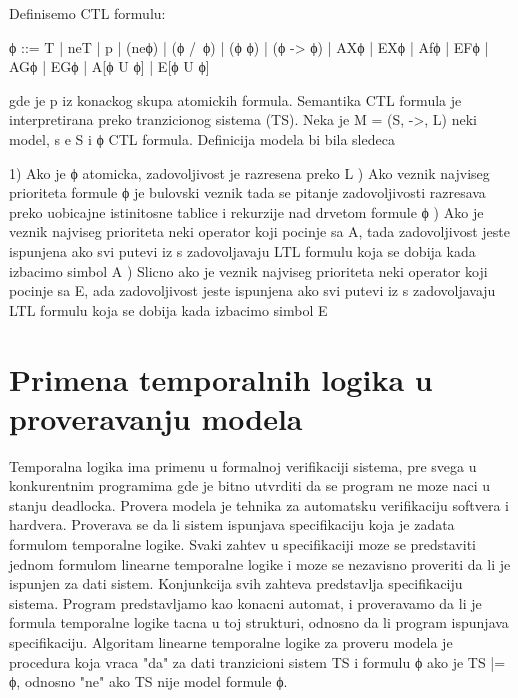 \documentclass[a4paper]{article}
\begin{document}
	Definisemo CTL formulu:

	ϕ ::= T | neT | p | (neϕ) | (ϕ /\ ϕ) | (ϕ \/ ϕ) | (ϕ -> ϕ) | AXϕ | EXϕ | Afϕ | EFϕ | AGϕ | EGϕ | A[ϕ U ϕ] | E[ϕ U ϕ]

	gde je p iz konackog skupa atomickih formula.
	\newline
	\newline
	Semantika
	\newline
	\newline
	CTL formula je interpretirana preko tranzicionog sistema (TS). Neka je M = (S, ->, L) neki model, s e S i ϕ CTL formula.
	Definicija modela bi bila sledeca

		1) Ako je ϕ atomicka, zadovoljivost je razresena preko L ) Ako veznik najviseg prioriteta formule ϕ je bulovski veznik tada se pitanje zadovoljivosti razresava
		   preko uobicajne istinitosne tablice i rekurzije nad drvetom formule ϕ ) Ako je veznik najviseg prioriteta neki operator koji pocinje sa A, tada zadovoljivost jeste ispunjena ako
		   svi putevi iz s zadovoljavaju LTL formulu koja se dobija kada izbacimo simbol A ) Slicno ako je veznik najviseg prioriteta neki operator koji pocinje sa E, ada zadovoljivost jeste ispunjena ako
		   svi putevi iz s zadovoljavaju LTL formulu koja se dobija kada izbacimo simbol E \newline

	\newpage

	\section{Primena temporalnih logika u proveravanju modela}
	\label{sec:MC}

	Temporalna logika ima primenu u formalnoj verifikaciji sistema, pre svega u konkurentnim programima gde je bitno utvrditi da se program ne moze naci u stanju deadlocka. 
	Provera modela je tehnika za automatsku verifikaciju softvera i hardvera. Proverava se da li sistem ispunjava specifikaciju koja je zadata formulom temporalne logike. 
	Svaki zahtev u specifikaciji moze se predstaviti jednom formulom linearne temporalne logike i moze se nezavisno proveriti da li je ispunjen za dati sistem. Konjunkcija svih zahteva predstavlja specifikaciju sistema.
	Program predstavljamo kao konacni automat, i proveravamo da li je formula temporalne logike tacna u toj strukturi, odnosno da li program ispunjava specifikaciju.
	Algoritam linearne temporalne logike za proveru modela je procedura koja vraca "da" za dati tranzicioni sistem TS i formulu ϕ ako je TS |= ϕ, odnosno "ne" ako TS nije model formule ϕ.
\end{document}
